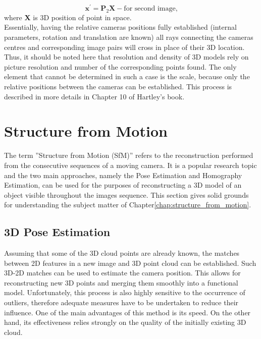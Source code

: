 \begin{equation}
 \textbf{x}^{'} = \textbf{P}_{2} \textbf{X} - \text{for second image,}
\end{equation}
where \textbf{X} is 3D position of point in space.
\\
Essentially, having the relative cameras positions fully established (internal parameters, rotation and translation are known) all rays connecting the cameras centres and corresponding image pairs will cross in place of their 3D location. Thus, it should be noted here that resolution and density of 3D models rely on picture resolution and number of the corresponding points found. 
The only element that cannot be determined in such a case is the scale, because only the relative positions between the cameras can be established. This process is described in more details in Chapter 10 of Hartley's book\cite{HartleyMultipleView}.
\section{Structure from Motion}
The term ''Structure from Motion (SfM)'' refers to the reconstruction performed from the consecutive sequences of a moving camera. It is a popular research topic and the two main approaches, namely the Pose Estimation and Homography Estimation, can be used for the purposes of reconstructing a 3D model of an object visible throughout the images sequence.
This section gives solid grounds for understanding the subject matter of Chapter\ref{chap:structure_from_motion}.
\subsection{3D Pose Estimation}
Assuming that some of the 3D cloud points are already known, the matches between 2D features in a new image and 3D point cloud can be established. Such 3D-2D matches can be used to estimate the camera position. This allows for reconstructing new 3D points and merging them smoothly into a functional model. Unfortunately, this process is also highly sensitive to the occurrence of outliers, therefore adequate measures have to be undertaken to reduce their influence. One of the main advantages of this method is its speed. On the other hand, its effectiveness relies strongly on the quality of the initially existing 3D cloud. 
